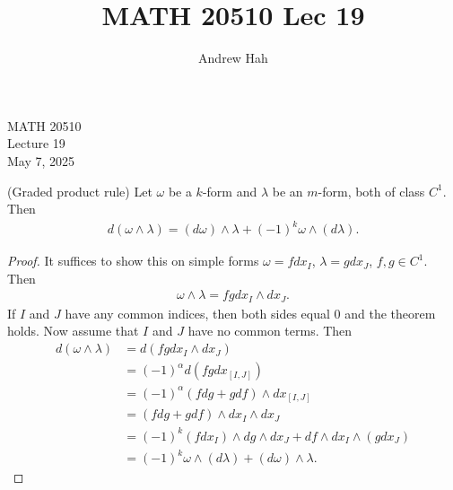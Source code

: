 \documentclass[11pt]{article}
\title{MATH 20510 Lec 19}
\author{Andrew Hah}
\begin{document}
\pagestyle{plain}
\begin{center}
{\Large MATH 20510} \\
{\Large Lecture 19} \\
\vspace{.2in}
May 7, 2025
\end{center}

\begin{theorem} (Graded product rule) Let $\omega$ be a $k$-form and $\lambda$ be an $m$-form, both of class $C^1$. Then \begin{align*} d(\omega \wedge \lambda) = (d \omega) \wedge \lambda + (-1)^k \omega \wedge (d \lambda).
\end{align*}
\end{theorem}
\begin{proof}
  It suffices to show this on simple forms $\omega = f dx_I$, $\lambda = g dx_J$, $f, g \in C^1$. Then \begin{align*} \omega \wedge \lambda = f g dx_I \wedge dx_J.
  \end{align*} If $I$ and $J$ have any common indices, then both sides equal $0$ and the theorem holds. Now assume that $I$ and $J$ have no common terms. Then \begin{align*} d(\omega \wedge \lambda) & = d(fg dx_I \wedge dx_J) \\ & = (-1)^{\alpha} d (fg dx_{[I, J]}) \\ & = (-1)^{\alpha} (f dg + g df) \wedge dx_{[I, J]} \\ & = (f dg + g df) \wedge dx_I \wedge dx_J \\ & = (-1)^k (f dx_I) \wedge dg \wedge dx_J + df \wedge dx_I \wedge (g dx_J) \\ & = (-1)^k \omega \wedge (d \lambda) + (d \omega) \wedge \lambda. 
  \end{align*}
\end{proof}
\end{document}
